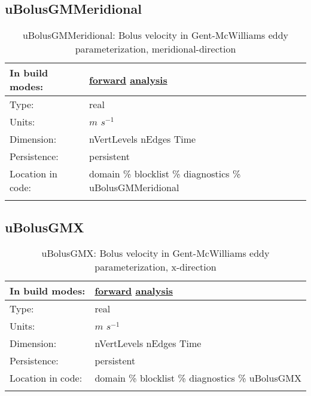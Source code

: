 \subsection[uBolusGMMeridional]{uBolusGMMeridional}
\label{subsec:var_sec_diagnostics_uBolusGMMeridional}
\begin{center}
\begin{longtable}{| p{2.0in} | p{4.0in} |}
        \hline 
        In build modes: & \hyperref[subsec:forward_var_tab_diagnostics]{forward} \hyperref[subsec:analysis_var_tab_diagnostics]{analysis} \\
        \hline 
        Type: & real \\
        \hline 
        Units: & $m$ $s^{-1}$ \\
        \hline 
        Dimension: & nVertLevels nEdges Time \\
        \hline 
        Persistence: & persistent \\
        \hline 
		 Location in code: & domain \% blocklist \% diagnostics \% uBolusGMMeridional \\
		 \hline 
    \caption{uBolusGMMeridional: Bolus velocity in Gent-McWilliams eddy parameterization, meridional-direction}
\end{longtable}
\end{center}
\subsection[uBolusGMX]{uBolusGMX}
\label{subsec:var_sec_diagnostics_uBolusGMX}
\begin{center}
\begin{longtable}{| p{2.0in} | p{4.0in} |}
        \hline 
        In build modes: & \hyperref[subsec:forward_var_tab_diagnostics]{forward} \hyperref[subsec:analysis_var_tab_diagnostics]{analysis} \\
        \hline 
        Type: & real \\
        \hline 
        Units: & $m$ $s^{-1}$ \\
        \hline 
        Dimension: & nVertLevels nEdges Time \\
        \hline 
        Persistence: & persistent \\
        \hline 
		 Location in code: & domain \% blocklist \% diagnostics \% uBolusGMX \\
		 \hline 
    \caption{uBolusGMX: Bolus velocity in Gent-McWilliams eddy parameterization, x-direction}
\end{longtable}
\end{center}
